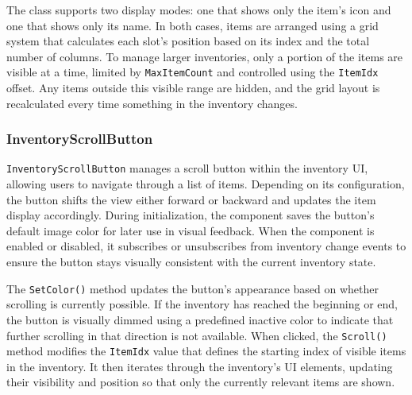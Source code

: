 The class supports two display modes: one that shows only the item's icon and one that shows only its name. In both cases, items are arranged using a grid system that calculates each slot’s position based on its index and the total number of columns. To manage larger inventories, only a portion of the items are visible at a time, limited by \verb|MaxItemCount| and controlled using the \verb|ItemIdx| offset. Any items outside this visible range are hidden, and the grid layout is recalculated every time something in the inventory changes.
 
\subsubsection{InventoryScrollButton}
\verb|InventoryScrollButton| manages a scroll button within the inventory UI, allowing users to navigate through a list of items. Depending on its configuration, the button shifts the view either forward or backward and updates the item display accordingly. During initialization, the component saves the button's default image color for later use in visual feedback. When the component is enabled or disabled, it subscribes or unsubscribes from inventory change events to ensure the button stays visually consistent with the current inventory state.

The \verb|SetColor()| method updates the button’s appearance based on whether scrolling is currently possible. If the inventory has reached the beginning or end, the button is visually dimmed using a predefined inactive color to indicate that further scrolling in that direction is not available. When clicked, the \verb|Scroll()| method modifies the \verb|ItemIdx| value that defines the starting index of visible items in the inventory. It then iterates through the inventory’s UI elements, updating their visibility and position so that only the currently relevant items are shown.



